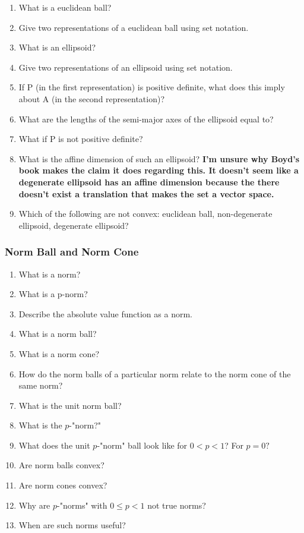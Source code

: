 \documentclass[]{article}
\newcounter{q}
\begin{document}
\begin{enumerate}[resume*]
\item What is a euclidean ball?
\item Give two representations of a euclidean ball using set notation.
\item What is an ellipsoid?
\item Give two representations of an ellipsoid using set notation.
\item If P (in the first representation) is positive definite, what does this imply about A (in the second representation)?
\item What are the lengths of the semi-major axes of the ellipsoid equal to?
\item What if P is not positive definite?
\item What is the affine dimension of such an ellipsoid? \textbf{I'm unsure why Boyd's book makes the claim it does regarding this. It doesn't seem like a degenerate ellipsoid has an affine dimension because the there doesn't exist a translation that makes the set a vector space.}
\item Which of the following are not convex: euclidean ball, non-degenerate ellipsoid, degenerate ellipsoid?
\end{enumerate}

\subsubsection*{Norm Ball and Norm Cone}

\begin{enumerate}[resume*]
\item What is a norm?
\item What is a p-norm?
\item Describe the absolute value function as a norm.
\item What is a norm ball?
\item What is a norm cone?
\item How do the norm balls of a particular norm relate to the norm cone of the same norm?
\item What is the unit norm ball?
\item What is the $p$-"norm?"
\item What does the unit $p$-"norm" ball look like for $0 < p < 1$? For $p=0?$
\item Are norm balls convex?
\item Are norm cones convex?
\item Why are $p$-"norms" with $0\leq p < 1$ not true norms?
\item When are such norms useful?
\end{enumerate}
\end{document}
